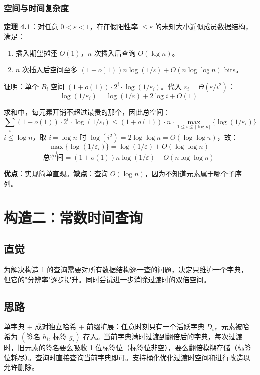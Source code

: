 \documentclass[UTF8,11pt,a4paper]{ctexart}
\begin{document}
\subsubsection{空间与时间复杂度}

\textbf{定理 4.1}：对任意 $0 < \varepsilon < 1$，存在假阳性率 $\le\varepsilon$ 的未知大小近似成员数据结构，满足：
\begin{enumerate}
    \item 插入期望摊还 $O(1)$，$n$ 次插入后查询 $O(\log n)$。
    \item $n$ 次插入后空间至多 $(1+o(1))n\log(1/\varepsilon) + O(n\log\log n)$ bits。
\end{enumerate}

证明：单个 $B_i$ 空间 $(1+o(1)) \cdot 2^i \cdot \log(1/\varepsilon_i)$。代入 $\varepsilon_i = \Theta(\varepsilon/i^2)$：
\[
\log(1/\varepsilon_i) = \log(1/\varepsilon) + 2\log i + O(1)
\]

求和中，每元素开销不超过最贵的那个，因此总空间：
\[
\sum_i (1+o(1)) \cdot 2^i \cdot \log(1/\varepsilon_i) \le (1+o(1)) \cdot n \cdot \max_{1 \le i \le \lceil\log n\rceil}\{\log(1/\varepsilon_i)\}
\]
$i \le \log n$，取 $i = \log n$ 时 $\log(i^2) = 2\log\log n = O(\log\log n)$，故：
\[
\max_i\{\log(1/\varepsilon_i)\} = \log(1/\varepsilon) + O(\log\log n)
\]
\[
\text{总空间} = (1+o(1))n\log(1/\varepsilon) + O(n\log\log n)
\]

\textbf{优点}：实现简单直观。\textbf{缺点}：查询 $O(\log n)$，因为不知道元素属于哪个子序列。

\section{构造二：常数时间查询}

\subsection{直觉}

为解决构造 1 的查询需要对所有数据结构逐一查的问题，决定只维护一个字典，但它的"分辨率"逐步提升。同时尝试进一步消除过渡时的双倍空间。

\subsection{思路}

单字典 + 成对独立哈希 + 前缀扩展：任意时刻只有一个活跃字典 $D_i$，元素被哈希为 $(\text{签名 }h_i,\ \text{标签 }g_i)$ 存入。当前字典满时过渡到翻倍后的字典，每次过渡时，旧元素的签名要么吸收 1 位标签位（标签位非空），要么翻倍模糊存储（标签位耗尽）。查询时直接查询当前字典即可。支持桶化优化过渡时空间和进行改造以允许删除。
\end{document}
